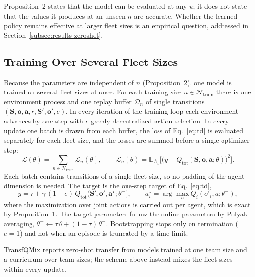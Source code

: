 Proposition~2 states that the model can be evaluated at any $n$; it does not state that the
values it produces at an unseen $n$ are accurate. Whether the learned policy remains
effective at larger fleet sizes is an empirical question, addressed in
Section~\ref{subsec:results-zeroshot}.

\subsection{Training Over Several Fleet Sizes}
\label{subsec:training}
Because the parameters are independent of $n$ (Proposition~2), one model is trained on
several fleet sizes at once. For each training size $n\in\mathcal{N}_{\text{train}}$ there is
one environment process and one replay buffer $\mathcal{D}_n$ of single transitions
$(\mathbf{S},\mathbf{o},\mathbf{a},r,\mathbf{S}',\mathbf{o}',e)$. In every iteration of the
training loop each environment advances by one step with $\epsilon$-greedy decentralized
action selection. In every update one batch is drawn from each buffer, the loss of
Eq.~\eqref{eq:td} is evaluated separately for each fleet size, and the losses are summed
before a single optimizer step:
\begin{equation}
\label{eq:joint-loss}
\mathcal{L}(\theta) = \sum_{n\in\mathcal{N}_{\text{train}}} \mathcal{L}_n(\theta),
\qquad
\mathcal{L}_n(\theta) = \mathbb{E}_{\mathcal{D}_n}\Big[\big(y - Q_{\text{tot}}(\mathbf{S},\mathbf{o},\mathbf{a};\theta)\big)^2\Big].
\end{equation}
Each batch contains transitions of a single fleet size, so no padding of the agent
dimension is needed. The target is the one-step target of Eq.~\eqref{eq:td},
\begin{equation}
\label{eq:target}
y = r + \gamma\,(1-e)\,Q_{\text{tot}}\big(\mathbf{S}',\mathbf{o}',\mathbf{a}^{\star};\theta^-\big),
\qquad
a^{\star}_i = \arg\max_{a} Q_i(o'_i,a;\theta^-),
\end{equation}
where the maximization over joint actions is carried out per agent, which is exact by
Proposition~1. The target parameters follow the online parameters by Polyak averaging,
$\theta^- \leftarrow \tau\,\theta + (1-\tau)\,\theta^-$. Bootstrapping stops only on
termination ($e=1$) and not when an episode is truncated by a time limit.

TransfQMix reports zero-shot transfer from models trained at one team size and a curriculum
over team sizes; the scheme above instead mixes the fleet sizes within every update.


